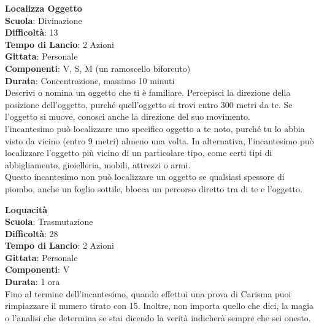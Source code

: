 \begin{multicols}{2}
\medskip\textbf{Localizza Oggetto}\\
\textbf{Scuola}: Divinazione\\
\textbf{Difficoltà}: 13\\
\textbf{Tempo di Lancio}: 2 Azioni\\
\textbf{Gittata}: Personale\\
\textbf{Componenti}: V, S, M (un ramoscello biforcuto)\\
\textbf{Durata}: Concentrazione, massimo 10 minuti \\
Descrivi o nomina un oggetto che ti è familiare. Percepisci la direzione della posizione dell'oggetto, purché quell'oggetto si trovi entro 300 metri da te. Se l'oggetto si muove, conosci anche la direzione del suo movimento.\\
l'incantesimo può localizzare uno specifico oggetto a te noto, purché tu lo abbia visto da vicino (entro 9 metri) almeno una volta. In alternativa, l'incantesimo può localizzare l'oggetto più vicino di un particolare tipo, come certi tipi di abbigliamento, gioielleria, mobili, attrezzi o armi.\\
Questo incantesimo non può localizzare un oggetto se qualsiasi spessore di piombo, anche un foglio sottile, blocca un percorso diretto tra di te e l'oggetto. 

\medskip\textbf{Loquacità}\\
\textbf{Scuola}: Trasmutazione\\
\textbf{Difficoltà}: 28\\
\textbf{Tempo di Lancio}: 2 Azioni\\
\textbf{Gittata}: Personale\\
\textbf{Componenti}: V\\
\textbf{Durata}: 1 ora\\
Fino al termine dell'incantesimo, quando effettui una prova di Carisma puoi rimpiazzare il numero tirato con 15. Inoltre, non importa quello che dici, la magia o l'analisi che determina se stai dicendo la verità indicherà sempre che sei onesto.


\end{multicols}
